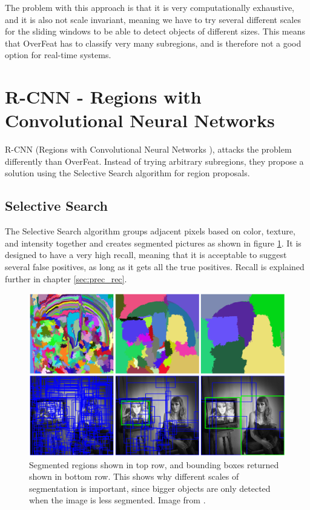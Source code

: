 The problem with this approach is that it is very computationally exhaustive, and it is also not scale invariant, meaning we have to try several different scales for the sliding windows to be able to detect objects of different sizes. This means that OverFeat has to classify very many subregions, and is therefore not a good option for real-time systems.


\section{R-CNN - Regions with Convolutional Neural Networks }
R-CNN (Regions with Convolutional Neural Networks  \citep{R-CNN}), attacks the problem differently than OverFeat. Instead of trying arbitrary subregions, they propose a solution using the Selective Search algorithm for region proposals.

\subsection{Selective Search }
The Selective Search algorithm \citep{SelSearch} groups adjacent pixels based on color, texture, and intensity together and creates segmented pictures as shown in figure \ref{fig:sel_serach}. It is designed to have a very high recall, meaning that it is acceptable to suggest several false positives, as long as it gets all the true positives. Recall is explained further in chapter \ref{sec:prec_rec}.

\begin{figure}[h!]
    \centering
    \includegraphics[width=0.8 \textwidth]{fig/sel_search.png}
    \caption{Segmented regions shown in top row, and bounding boxes returned shown in bottom row. This shows why different scales of segmentation is important, since bigger objects are only detected when the image is less segmented. Image from \citep{SelSearch}.}
    \label{fig:sel_serach}
\end{figure}

